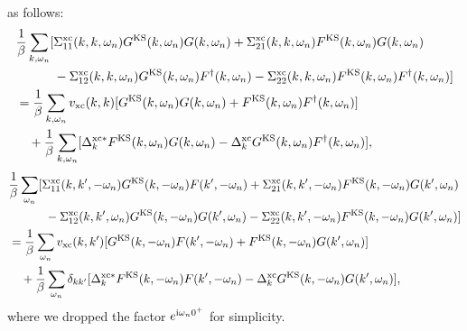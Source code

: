 as follows:
%
\begin{equation}
	\begin{split}
	& \frac{1}{\beta} \sum_{k,\omega_n} [\Sigma^{\rm xc}_{11}(k,k,\omega_n)
	  G^{\rm KS}(k,\omega_n)G(k,\omega_n) + \Sigma^{\rm xc}_{21}(k,k,\omega_n)
	  F^{\rm KS}(k,\omega_n)G(k,\omega_n) \\
  	&\quad \quad \quad - \Sigma^{\rm xc}_{12}(k,k,\omega_n)G^{\rm KS}(k,\omega_n)F^{\dag}(k,\omega_n)
	- \Sigma^{\rm xc}_{22}(k,k,\omega_n)F^{\rm KS}(k,\omega_n)F^{\dag}(k,\omega_n)] \\
	& = \frac{1}{\beta}\sum_{k, \omega_n} v_{\rm xc}(k,k)
	[G^{\rm KS}(k,\omega_n)G(k,\omega_n) + F^{\rm KS}(k,\omega_n)F^{\dag}(k,\omega_n)] \\
	&\quad + \frac{1}{\beta} \sum_{k,\omega_n}[\Delta^{\rm xc\ast}_{k}
		F^{\rm KS}(k, \omega_n)G(k, \omega_n) - \Delta^{\rm xc}_{k}G^{\rm KS}(k,\omega_n)
	F^{\dag}(k,\omega_n)],
	\label{eq:11comp2}
\end{split}
\end{equation}
%
\begin{equation}
	\begin{split}
	& \frac{1}{\beta} \sum_{\omega_n} [\Sigma^{\rm xc}_{11}(k,k',-\omega_n)
	  G^{\rm KS}(k,-\omega_n)F(k',-\omega_n) + \Sigma^{\rm xc}_{21}(k,k',-\omega_n)
	  F^{\rm KS}(k,-\omega_n)G(k',\omega_n) \\
  	&\quad \quad \quad - \Sigma^{\rm xc}_{12}(k,k',\omega_n)G^{\rm KS}(k,-\omega_n)G(k',\omega_n)
	- \Sigma^{\rm xc}_{22}(k,k',-\omega_n)F^{\rm KS}(k,-\omega_n)G(k',\omega_n)] \\
	& = \frac{1}{\beta}\sum_{\omega_n} v_{\rm xc}(k,k')
	[G^{\rm KS}(k,-\omega_n)F(k',-\omega_n) + F^{\rm KS}(k,-\omega_n)G(k',\omega_n)] \\
	&\quad + \frac{1}{\beta} \sum_{\omega_n}\delta_{kk'}[\Delta^{\rm xc\ast}_{k}
		F^{\rm KS}(k, -\omega_n)F(k', -\omega_n) - \Delta^{\rm xc}_{k}G^{\rm KS}(k,-\omega_n)
	G(k',\omega_n)],
	\label{eq:12comp2}
\end{split}
\end{equation}
where we dropped the factor $e^{ {\rm i}\omega_n0^{+}}$ for simplicity.


